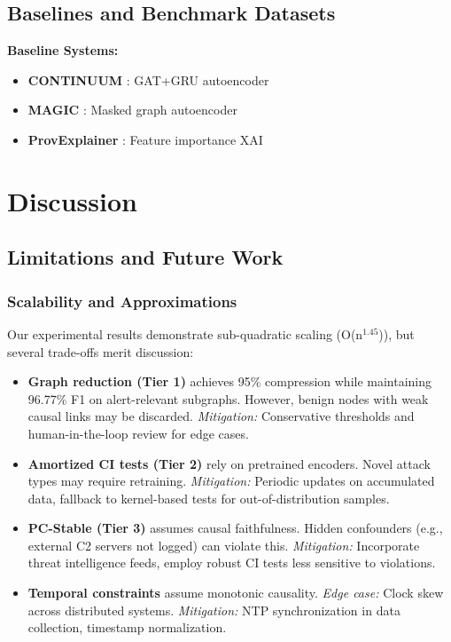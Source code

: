 \documentclass[conference]{IEEEtran}
\begin{document}
\subsection{Baselines and Benchmark Datasets}

\textbf{Baseline Systems:}
\begin{itemize}
    \item \textbf{CONTINUUM} \cite{continuum}: GAT+GRU autoencoder
    \item \textbf{MAGIC} \cite{magic}: Masked graph autoencoder
    \item \textbf{ProvExplainer} \cite{provexplainer}: Feature importance XAI
\end{itemize}

\section{Discussion}

\subsection{Limitations and Future Work}

\subsubsection{Scalability and Approximations}

Our experimental results demonstrate sub-quadratic scaling (O(n$^{1.45}$)), but several trade-offs merit discussion:

\begin{itemize}
    \item \textbf{Graph reduction (Tier 1)} achieves 95\% compression while maintaining 96.77\% F1 on alert-relevant subgraphs. However, benign nodes with weak causal links may be discarded. \textit{Mitigation:} Conservative thresholds and human-in-the-loop review for edge cases.
    
    \item \textbf{Amortized CI tests (Tier 2)} rely on pretrained encoders. Novel attack types may require retraining. \textit{Mitigation:} Periodic updates on accumulated data, fallback to kernel-based tests for out-of-distribution samples.
    
    \item \textbf{PC-Stable (Tier 3)} assumes causal faithfulness. Hidden confounders (e.g., external C2 servers not logged) can violate this. \textit{Mitigation:} Incorporate threat intelligence feeds, employ robust CI tests less sensitive to violations.
    
    \item \textbf{Temporal constraints} assume monotonic causality. \textit{Edge case:} Clock skew across distributed systems. \textit{Mitigation:} NTP synchronization in data collection, timestamp normalization.
\end{itemize}
\end{document}
